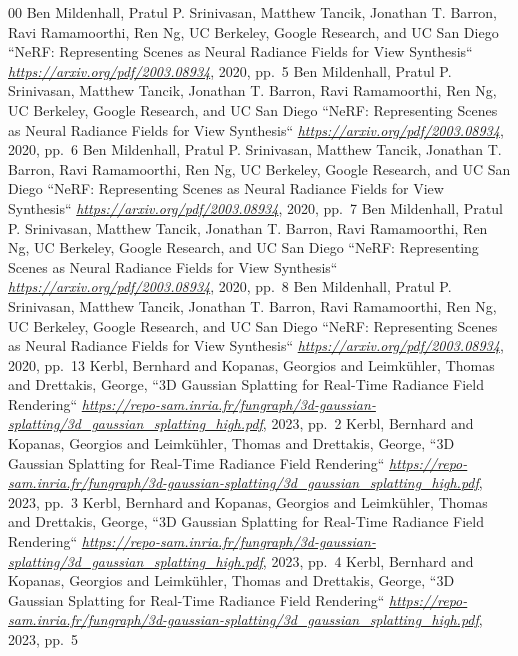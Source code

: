 \documentclass[conference]{IEEEtran}
\begin{document}
\begin{thebibliography}{00}
 Ben Mildenhall, Pratul P. Srinivasan, Matthew Tancik,
Jonathan T. Barron, Ravi Ramamoorthi, Ren Ng, UC Berkeley, Google Research, and UC San Diego ``NeRF: Representing Scenes as Neural Radiance Fields for View Synthesis`` \emph{\url{https://arxiv.org/pdf/2003.08934}}, 2020, pp.~5
 Ben Mildenhall, Pratul P. Srinivasan, Matthew Tancik,
Jonathan T. Barron, Ravi Ramamoorthi, Ren Ng, UC Berkeley, Google Research, and UC San Diego ``NeRF: Representing Scenes as Neural Radiance Fields for View Synthesis`` \emph{\url{https://arxiv.org/pdf/2003.08934}}, 2020, pp.~6
 Ben Mildenhall, Pratul P. Srinivasan, Matthew Tancik,
Jonathan T. Barron, Ravi Ramamoorthi, Ren Ng, UC Berkeley, Google Research, and UC San Diego ``NeRF: Representing Scenes as Neural Radiance Fields for View Synthesis`` \emph{\url{https://arxiv.org/pdf/2003.08934}}, 2020, pp.~7
 Ben Mildenhall, Pratul P. Srinivasan, Matthew Tancik,
Jonathan T. Barron, Ravi Ramamoorthi, Ren Ng, UC Berkeley, Google Research, and UC San Diego ``NeRF: Representing Scenes as Neural Radiance Fields for View Synthesis`` \emph{\url{https://arxiv.org/pdf/2003.08934}}, 2020, pp.~8
 Ben Mildenhall, Pratul P. Srinivasan, Matthew Tancik,
Jonathan T. Barron, Ravi Ramamoorthi, Ren Ng, UC Berkeley, Google Research, and UC San Diego ``NeRF: Representing Scenes as Neural Radiance Fields for View Synthesis`` \emph{\url{https://arxiv.org/pdf/2003.08934}}, 2020, pp.~13
 Kerbl, Bernhard and Kopanas, Georgios and Leimk{\"u}hler, Thomas and Drettakis, George, ``3D Gaussian Splatting for Real-Time Radiance Field Rendering`` \emph{\url{https://repo-sam.inria.fr/fungraph/3d-gaussian-splatting/3d_gaussian_splatting_high.pdf}}, 2023, pp.~2
 Kerbl, Bernhard and Kopanas, Georgios and Leimk{\"u}hler, Thomas and Drettakis, George, ``3D Gaussian Splatting for Real-Time Radiance Field Rendering`` \emph{\url{https://repo-sam.inria.fr/fungraph/3d-gaussian-splatting/3d_gaussian_splatting_high.pdf}}, 2023, pp.~3
 Kerbl, Bernhard and Kopanas, Georgios and Leimk{\"u}hler, Thomas and Drettakis, George, ``3D Gaussian Splatting for Real-Time Radiance Field Rendering`` \emph{\url{https://repo-sam.inria.fr/fungraph/3d-gaussian-splatting/3d_gaussian_splatting_high.pdf}}, 2023, pp.~4
 Kerbl, Bernhard and Kopanas, Georgios and Leimk{\"u}hler, Thomas and Drettakis, George, ``3D Gaussian Splatting for Real-Time Radiance Field Rendering`` \emph{\url{https://repo-sam.inria.fr/fungraph/3d-gaussian-splatting/3d_gaussian_splatting_high.pdf}}, 2023, pp.~5

\end{thebibliography}
\end{document}
